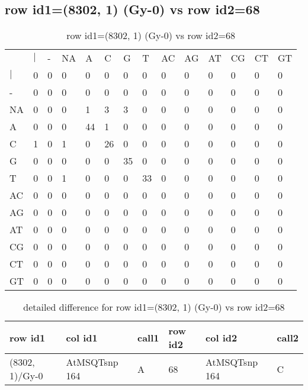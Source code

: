 \subsection{row id1=(8302, 1) (Gy-0) vs row id2=68}
\begin{center}
\begin{longtable}{|l|l|l|l|l|l|l|l|l|l|l|l|l|l|}
\caption{row id1=(8302, 1) (Gy-0) vs row id2=68} \label{table_dm282}\\
\hline
\\
\hline
&$|$&-&NA&A&C&G&T&AC&AG&AT&CG&CT&GT\\
$|$&0&0&0&0&0&0&0&0&0&0&0&0&0\\
-&0&0&0&0&0&0&0&0&0&0&0&0&0\\
NA&0&0&0&1&3&3&0&0&0&0&0&0&0\\
A&0&0&0&44&1&0&0&0&0&0&0&0&0\\
C&1&0&1&0&26&0&0&0&0&0&0&0&0\\
G&0&0&0&0&0&35&0&0&0&0&0&0&0\\
T&0&0&1&0&0&0&33&0&0&0&0&0&0\\
AC&0&0&0&0&0&0&0&0&0&0&0&0&0\\
AG&0&0&0&0&0&0&0&0&0&0&0&0&0\\
AT&0&0&0&0&0&0&0&0&0&0&0&0&0\\
CG&0&0&0&0&0&0&0&0&0&0&0&0&0\\
CT&0&0&0&0&0&0&0&0&0&0&0&0&0\\
GT&0&0&0&0&0&0&0&0&0&0&0&0&0\\
\hline
\end{longtable}
\end{center}

\begin{center}
\begin{longtable}{|l|l|l|l|l|l|}
\caption{detailed difference for row id1=(8302, 1) (Gy-0) vs row id2=68} \label{table_dm283}\\
\hline
row id1&col id1&call1&row id2&col id2&call2\\
\hline
(8302, 1)/Gy-0&AtMSQTsnp 164&A&68&AtMSQTsnp 164&C\\
\hline
\end{longtable}
\end{center}

